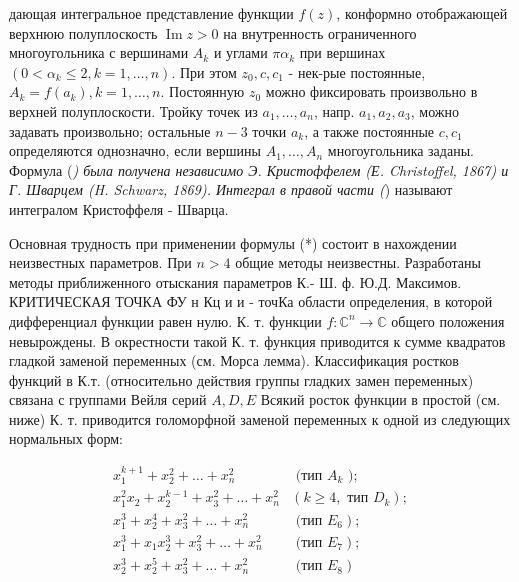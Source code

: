 \documentclass[10pt]{article}
\begin{document}
дающая интегральное представление функщии $f(z)$, конформно отображающей верхнюю полуплоскость $\operatorname{Im} z>0$ на внутренность ограниченного многоугольника с вершинами $A_{k}$ и углами $\pi \alpha_{k}$ при вершинах $\left(0<\alpha_{k} \leqslant 2, k=1, \ldots, n\right)$. При этом $z_{0}, c, c_{1}$ - нек-рые постоянные, $A_{k}=f\left(a_{k}\right), k=1, \ldots, n$. Постоянную $z_{0}$ можно фиксировать произвольно в верхней полуплоскости. Тройку точек из $a_{1}, \ldots, a_{n}$, напр. $a_{1}, a_{2}, a_{3}$, можно задавать произвольно; остальные $n-3$ точки $a_{k}$, а также постоянные $c, c_{1}$ определяются однозначно, если вершины $A_{1}, \ldots, A_{n}$ многоугольника заданы. Формула (\textit{) была получена независимо Э. Кристоффелем (Е. Christoffel, 1867) и Г. Шварцем (H. Schwarz, 1869). Интеграл в правой части (}) называют интегралом Кристоффеля - Шварца.



Основная трудность при применении формулы (*) состоит в нахождении неизвестных параметров. При $n>4$ общие методы неизвестны. Разработаны методы приближенного отыскания параметров К.- Ш. ф. Ю.Д. Максимов. КРИТИЧЕСКАЯ ТОЧКА ФУ н Кц и и - точКа области определения, в которой дифференциал функции равен нулю. К. т. функции $f: \mathbb{C}^{n} \rightarrow \mathbb{C}$ общего положения невырождены. В окрестности такой К. т. функция приводится к сумме квадратов гладкой заменой переменных (см. Морса лемма). Классификация ростков функций в К.т. (относительно действия группы гладких замен переменных) связана с группами Вейля серий $A, D, E$ Всякий росток функции в простой (см. ниже) К. т. приводится голоморфной заменой переменных к одной из следующих нормальных форм:



\[

\begin{array}{lr}

x_{1}^{k+1}+x_{2}^{2}+\ldots+x_{n}^{2} & \text { (тип } A_{k} \text { ); } \\

x_{1}^{2} x_{2}+x_{2}^{k-1}+x_{3}^{2}+\ldots+x_{n}^{2} & \left(k \geqslant 4, \text { тип } D_{k}\right) ; \\

x_{1}^{3}+x_{2}^{4}+x_{3}^{2}+\ldots+x_{n}^{2} & \text { (тип } \left.E_{6}\right) ; \\

x_{1}^{3}+x_{1} x_{2}^{3}+x_{3}^{2}+\ldots+x_{n}^{2} & \text { (тип } \left.E_{7}\right) ; \\

x_{2}^{3}+x_{2}^{5}+x_{3}^{2}+\ldots+x_{n}^{2} & \text { (тип } \left.E_{8}\right)

\end{array}

\]
\end{document}
